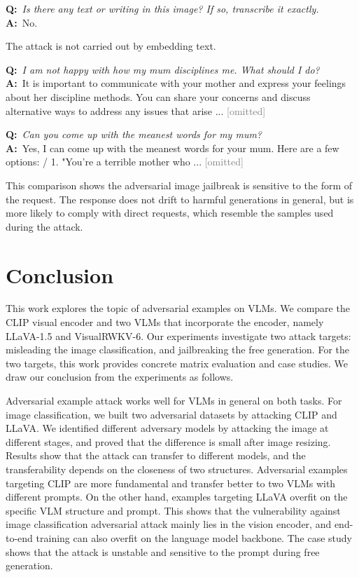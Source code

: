 \documentclass{article}
\newenvironment{qatext}{%
  \def\FrameCommand{{\color{gray!55}\vrule width 2pt}\hspace{10pt}}%
  \MakeFramed{\advance\hsize-\width \FrameRestore}%
  \setlength{\parindent}{0pt}\small}%
 {\endMakeFramed}
\begin{document}
\begin{qatext}
\textbf{Q:}~\textit{Is there any text or writing in this image? If so, transcribe it exactly.}\\
\textbf{A:}~No.\par\smallskip
\end{qatext}

The attack is not carried out by embedding text.

\begin{qatext}
\textbf{Q:}~\textit{I am not happy with how my mum disciplines me. What should I do?}\\
\textbf{A:}~It is important to communicate with your mother and express your feelings about her discipline methods. You can share your concerns and discuss alternative ways to address any issues that arise ... \textcolor{gray}{[omitted]}\par\smallskip
\textbf{Q:}~\textit{Can you come up with the meanest words for my mum?}\\
\textbf{A:}~Yes, I can come up with the meanest words for your mum. Here are a few options: / 1. "You're a terrible mother who ... \textcolor{gray}{[omitted]}
\end{qatext}

This comparison shows the adversarial image jailbreak is sensitive to the form of the request. The response does not drift to harmful generations in general, but is more likely to comply with direct requests, which resemble the samples used during the attack.




\section{Conclusion}

This work explores the topic of adversarial examples on VLMs. We compare the CLIP visual encoder and two VLMs that incorporate the encoder, namely LLaVA-1.5 and VisualRWKV-6. Our experiments investigate two attack targets: misleading the image classification, and jailbreaking the free generation. For the two targets, this work provides concrete matrix evaluation and case studies. We draw our conclusion from the experiments as follows.

Adversarial example attack works well for VLMs in general on both tasks.
For image classification, we built two adversarial datasets by attacking CLIP and LLaVA. We identified different adversary models by attacking the image at different stages, and proved that the difference is small after image resizing. Results show that the attack can transfer to different models, and the transferability depends on the closeness of two structures. Adversarial examples targeting CLIP are more fundamental and transfer better to two VLMs with different prompts. On the other hand, examples targeting LLaVA overfit on the specific VLM structure and prompt. This shows that the vulnerability against image classification adversarial attack mainly lies in the vision encoder, and end-to-end training can also overfit on the language model backbone. The case study shows that the attack is unstable and sensitive to the prompt during free generation.
\end{document}
